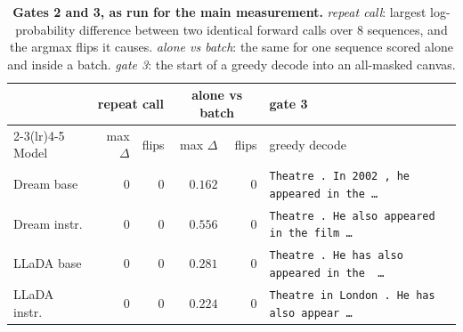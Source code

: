 \begin{table}[!ht]
\centering
\footnotesize
\setlength{\tabcolsep}{4pt}
\begin{tabular}{lrrrrl}
\toprule
 & \multicolumn{2}{c}{repeat call} & \multicolumn{2}{c}{alone vs batch} & gate 3 \\
\cmidrule(lr){2-3}\cmidrule(lr){4-5}
Model & max $\Delta$ & flips & max $\Delta$ & flips & greedy decode \\
\midrule
Dream base & $0$ & $0$ & $0.162$ & $0$ & \texttt{\footnotesize Theatre . In 2002 , he appeared in the\,\ldots} \\
Dream instr. & $0$ & $0$ & $0.556$ & $0$ & \texttt{\footnotesize Theatre . He also appeared in the film\,\ldots} \\
LLaDA base & $0$ & $0$ & $0.281$ & $0$ & \texttt{\footnotesize Theatre . He has also appeared in the \,\ldots} \\
LLaDA instr. & $0$ & $0$ & $0.224$ & $0$ & \texttt{\footnotesize Theatre in London . He has also appear\,\ldots} \\
\bottomrule
\end{tabular}
\caption{\textbf{Gates 2 and 3, as run for the main measurement.} \emph{repeat call}:
largest log-probability difference between two identical forward calls over $8$
sequences, and the argmax flips it causes. \emph{alone vs batch}: the same for one
sequence scored alone and inside a batch. \emph{gate 3}: the start of a greedy decode
into an all-masked canvas.}\label{tab:gatedetail}
\end{table}
